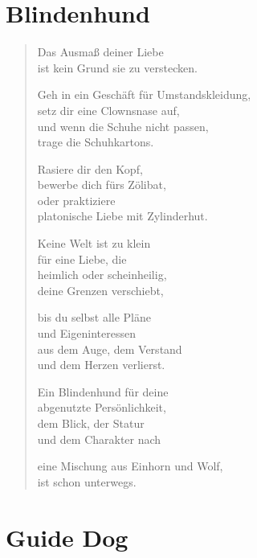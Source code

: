 
\cleartoverso

\section{Blindenhund}

\begin{verse}

Das Ausmaß deiner Liebe\\
ist kein Grund sie zu verstecken.

Geh in ein Geschäft für Umstandskleidung,\\
setz dir eine Clownsnase auf,\\
und wenn die Schuhe nicht passen,\\
trage die Schuhkartons.

Rasiere dir den Kopf,\\
bewerbe dich fürs Zölibat,\\
oder praktiziere\\
platonische Liebe mit Zylinderhut.

Keine Welt ist zu klein\\
für eine Liebe, die\\
heimlich oder scheinheilig,\\
deine Grenzen verschiebt,

bis du selbst alle Pläne\\
und Eigeninteressen\\
aus dem Auge, dem Verstand\\
und dem Herzen verlierst.

\clearpage

Ein Blindenhund für deine\\
abgenutzte Persönlichkeit,\\
dem Blick, der Statur\\
und dem Charakter nach

eine Mischung aus Einhorn und Wolf,\\
ist schon unterwegs.

\end{verse}

\clearpage

\section{Guide Dog}

